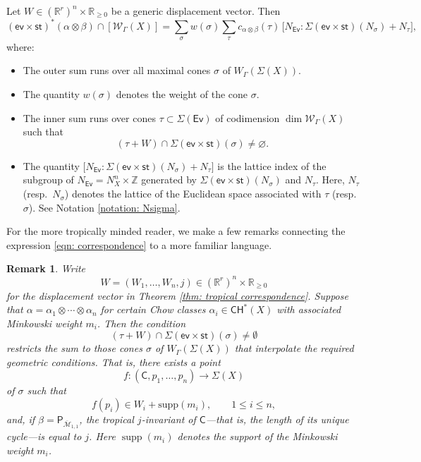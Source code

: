 \documentclass{article}
\def\Ev{{\mathsf{Ev}}}
\def\Z{\mathbb{Z}}
\def\WG{\mathcal{W}_{\Gamma}}
\newtheorem{remark}[definition]{Remark}
\newenvironment{customthm}[1]
{\renewcommand\theinnercustomthm{#1}\innercustomthm}
{\endinnercustomthm}
\begin{document}
\begin{customthm}{B}[Correspondence theorem, Part I]\label{thm: tropical correspondence}
Let $W \in (\mathbb{R}^r)^n \times \mathbb{R}_{\geq 0}$ be a generic displacement vector. Then
\begin{equation}\label{eqn: correspondence}
(\mathsf{ev} \times \mathsf{st})^*(\alpha \otimes \beta) \cap [\WG(X)]
=
\sum_{\sigma} 
w(\sigma)
\sum_{\tau}
c_{\alpha \otimes \beta}(\tau)\,
\bigl[
N_{\Ev}: \Sigma( \mathsf{ev} \times \mathsf{st})(N_\sigma)  +N_\tau
\bigr],
\end{equation}
where:
\begin{itemize}
\item The outer sum runs over all maximal cones $\sigma$ of $W_{\Gamma}(\Sigma(X))$.
\item The quantity $w(\sigma)$ denotes the weight of the cone $\sigma$. 
\item The inner sum runs over cones $\tau \subset \Sigma(\Ev)$ of codimension $\dim \WG(X)$ such that
$$(\tau + W) \cap \Sigma( \mathsf{ev} \times \mathsf{st})(\sigma) \neq \varnothing.$$
\item The quantity $\bigl[  N_{\Ev}: \Sigma( \mathsf{ev} \times \mathsf{st})(N_\sigma)  +N_\tau  \bigr]$ is the lattice index of the subgroup of $N_{\Ev}= N_X^n \times \Z$ generated by $\Sigma( \mathsf{ev} \times \mathsf{st})(N_\sigma)$ and $N_\tau$. Here, $N_\tau$ (resp.\ $N_\sigma$) denotes the lattice of the Euclidean space associated with $\tau$ (resp.\ $\sigma$). See Notation \ref{notation: Nsigma}.
\end{itemize}
\end{customthm}

For the more tropically minded reader, we make a few remarks connecting the expression \eqref{eqn: correspondence} to a more familiar language.


\begin{remark}
     Write 
\[
W = (W_1, \ldots, W_n, j) \in (\mathbb{R}^r)^n \times \mathbb{R}_{\ge 0}
\] for the displacement vector in Theorem \ref{thm: tropical correspondence}.
Suppose that 
$
\alpha = \alpha_1\otimes \cdots \otimes \alpha_n
$
for certain Chow classes $\alpha_i \in \mathsf{CH}^*(X)$ with associated Minkowski weight $m_i$. Then the condition
\[
(\tau + W) \cap \Sigma(\mathsf{ev} \times \mathsf{st})(\sigma) \neq \emptyset
\]
restricts the sum to those cones $\sigma$ of $W_{\Gamma}(\Sigma(X))$ that interpolate the required geometric conditions. That is, there exists a point
\[
f \colon (\mathsf{C}, p_1, \ldots, p_n) \longrightarrow \Sigma(X)
\]
of $\sigma$ such that
\[
f(p_i) \in W_i + \mathrm{supp}(m_i), \qquad 1 \le i \le n,
\]
and, if $\beta = \mathsf{P}_{\overline{\mathcal{M}}_{1,1}}$, the tropical $j$-invariant of $\mathsf{C}$—that is, the length of its unique cycle—is equal to $j$. Here $\operatorname{supp}(m_i)$ denotes the support of the Minkowski weight $m_i$.
\end{remark}
\end{document}
